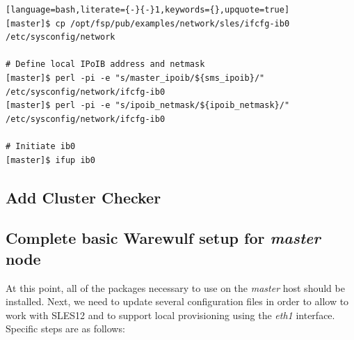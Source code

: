 \documentclass[letterpaper]{article}
\newcommand{\baseOS}{SLES12}
\begin{document}
\begin{lstlisting}[language=bash,literate={-}{-}1,keywords={},upquote=true]
[master]$ cp /opt/fsp/pub/examples/network/sles/ifcfg-ib0 /etc/sysconfig/network

# Define local IPoIB address and netmask
[master]$ perl -pi -e "s/master_ipoib/${sms_ipoib}/" /etc/sysconfig/network/ifcfg-ib0
[master]$ perl -pi -e "s/ipoib_netmask/${ipoib_netmask}/" /etc/sysconfig/network/ifcfg-ib0

# Initiate ib0
[master]$ ifup ib0
\end{lstlisting}

\subsection{Add Cluster Checker} \label{sec:add_clck}


\subsection{Complete basic Warewulf setup for {\em master} node} \label{sec:setup_ww}

At this point, all of the packages necessary to use \Warewulf{} on the {\em
  master} host should be installed.  Next, we need to update several
configuration files in order to allow \Warewulf{} to work with \baseOS{} and to support
local provisioning using the {\em eth1} interface.  Specific steps are as
follows:

\end{document}
